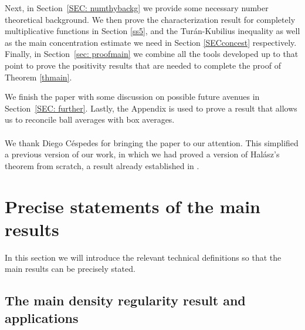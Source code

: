\documentclass[11pt]{amsart}
\theoremstyle{definition}
\begin{document}
Next, in Section~\ref{SEC: numthybackg} we provide some necessary number theoretical background. %
We then prove the characterization result for completely multiplicative functions in Section \ref{ss5}, and the Tur\'an-Kubilius inequality as well as the main concentration estimate we need in Section \ref{SECconcest} respectively.
Finally, in  Section~\ref{sec: proofmain} we combine all  the tools developed up to that point to prove the positivity results that are needed to complete the proof of Theorem \ref{thmain}.


We finish the paper with some discussion on possible future avenues in Section~\ref{SEC: further}. 
Lastly, the Appendix is used to prove a result that allows us to reconcile ball averages with box averages.
\\ \\
 We thank Diego C\'espedes for bringing the paper \cite{lucht2001} to our attention. This simplified a previous version of our work, in which we had proved a version of Hal\'asz's theorem from scratch, a result already established in \cite{lucht2001}.
 



\section{Precise statements of the main results}\label{spps}
In this section we will introduce the relevant technical definitions so that the main results can be precisely stated.
\subsection{The main density regularity result and applications}
\end{document}
